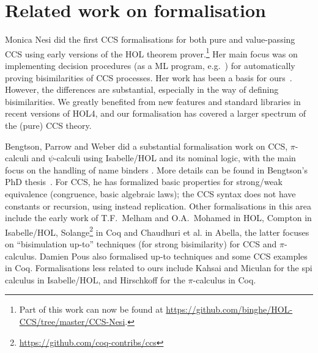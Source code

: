 \section{Related work on formalisation}
\label{s:rel}

Monica Nesi did the first CCS formalisations for both pure and
value-passing CCS \cite{Nesi:1992ve,Nesi:2017wo} using early versions of the HOL
theorem prover.\footnote{Part of this work can now be found at
  \url{https://github.com/binghe/HOL-CCS/tree/master/CCS-Nesi}.}
Her main focus was on implementing decision procedures (as a ML
program, e.g.~\cite{cleaveland1993concurrency}) for
automatically proving bisimilarities of CCS processes.
Her work has been a basis for ours~\cite{Tian:2017wrba}.
However, the differences are substantial, especially in the way of defining
bisimilarities. We greatly benefited from new features and standard
libraries in recent versions of HOL4, and our formalisation has
covered a  larger spectrum of the (pure) CCS theory.

Bengtson, Parrow and Weber did a substantial formalisation work
on CCS, $\pi$-calculi
and $\psi$-calculi 
using Isabelle/HOL and its nominal logic, with the main focus on the handling of
name binders \cite{bengtson2007completeness,parrow2009formalising}.
More details can be found in Bengtson's PhD thesis~\cite{bengtson2010formalising}. For CCS, 
he has formalized basic properties for strong/weak equivalence (congruence, basic
 algebraic laws); the CCS syntax does not have constants
or recursion, using instead replication.
%
Other formalisations in this area include the early work of T.F.~Melham
\cite{melham1994mechanized} and O.A.~Mohamed
\cite{mohamed1995mechanizing} in HOL, Compton
\cite{compton2005embedding} in Isabelle/HOL,
Solange\footnote{\url{https://github.com/coq-contribs/ccs}} in Coq
and Chaudhuri et al.\;\cite{chaudhuri2015lightweight} in Abella, the latter
focuses on ``bisimulation up-to'' techniques (for strong bisimilarity)
for CCS and $\pi$-calculus.
Damien Pous \cite{pous2007new} also formalised up-to techniques and some CCS examples in
Coq.
Formalisations less related to ours
include Kahsai and Miculan \cite{kahsai2008implementing} for the spi
calculus in Isabelle/HOL, and Hirschkoff \cite{hirschkoff1997full} for the $\pi$-calculus in Coq.

